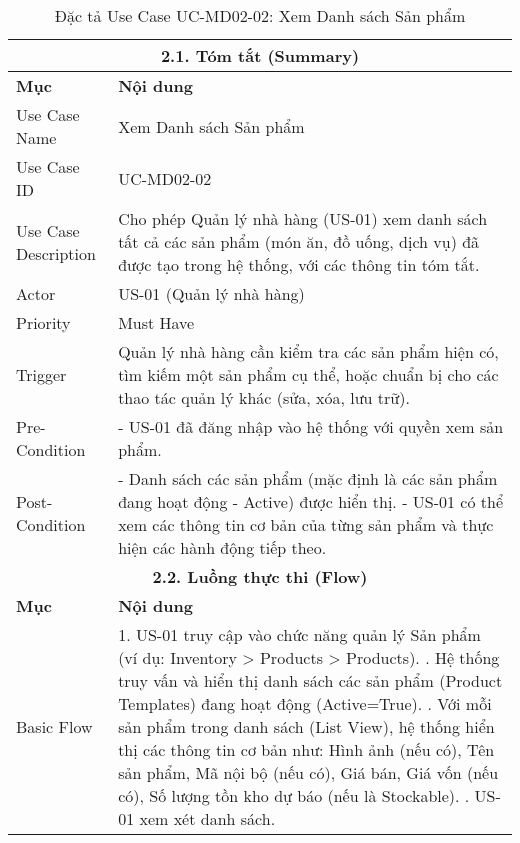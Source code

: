 \begin{longtable}{|m{4cm}|p{11cm}|}
\caption{Đặc tả Use Case UC-MD02-02: Xem Danh sách Sản phẩm} \label{tab:uc_md02_02_revised} \\
\hline
\multicolumn{2}{|c|}{\textbf{2.1. Tóm tắt (Summary)}} \\
\hline
\textbf{Mục} & \textbf{Nội dung} \\
\hline
\endhead %
\hline
\endfoot %
\hline
\endlastfoot %
Use Case Name & Xem Danh sách Sản phẩm \\
\hline
Use Case ID & UC-MD02-02 \\
\hline
Use Case Description & Cho phép Quản lý nhà hàng (US-01) xem danh sách tất cả các sản phẩm (món ăn, đồ uống, dịch vụ) đã được tạo trong hệ thống, với các thông tin tóm tắt. \\
\hline
Actor & US-01 (Quản lý nhà hàng) \\
\hline
Priority & Must Have \\
\hline
Trigger & Quản lý nhà hàng cần kiểm tra các sản phẩm hiện có, tìm kiếm một sản phẩm cụ thể, hoặc chuẩn bị cho các thao tác quản lý khác (sửa, xóa, lưu trữ). \\
\hline
Pre-Condition & - US-01 đã đăng nhập vào hệ thống với quyền xem sản phẩm. \\
\hline
Post-Condition & - Danh sách các sản phẩm (mặc định là các sản phẩm đang hoạt động - Active) được hiển thị. \newline - US-01 có thể xem các thông tin cơ bản của từng sản phẩm và thực hiện các hành động tiếp theo. \\
\hline
\multicolumn{2}{|c|}{\textbf{2.2. Luồng thực thi (Flow)}} \\
\hline
\textbf{Mục} & \textbf{Nội dung} \\
\hline
Basic Flow & 1. US-01 truy cập vào chức năng quản lý Sản phẩm (ví dụ: Inventory > Products > Products). \newline 2. Hệ thống truy vấn và hiển thị danh sách các sản phẩm (Product Templates) đang hoạt động (Active=True). \newline 3. Với mỗi sản phẩm trong danh sách (List View), hệ thống hiển thị các thông tin cơ bản như: Hình ảnh (nếu có), Tên sản phẩm, Mã nội bộ (nếu có), Giá bán, Giá vốn (nếu có), Số lượng tồn kho dự báo (nếu là Stockable). \newline 4. US-01 xem xét danh sách. \\
\hline

\end{longtable}
